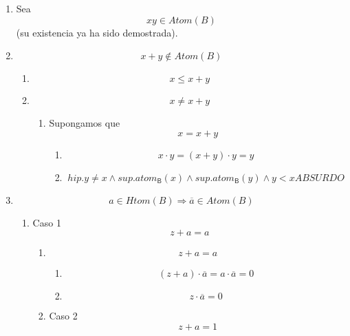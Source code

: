 \documentclass[
]{article}
\providecommand{\tightlist}{%
  \setlength{\itemsep}{0pt}\setlength{\parskip}{0pt}}
\begin{document}
\begin{enumerate}
\begin{enumerate}
\begin{enumerate}
      \begin{enumerate}
      \def\labelenumiv{\arabic{enumiv}.}
      \item
        Sea \[{\mathit{xy} \in \mathit{Atom}}{(B)}\] (su existencia ya
        ha sido demostrada).
      \item
        \[{{x + y} \notin \mathit{Atom}}{(B)}\]

        \begin{enumerate}
        \def\labelenumv{\arabic{enumv}.}
        \item
          \[x \leq {x + y}\]
        \item
          \[x \neq {x + y}\]

          \begin{enumerate}
          \def\labelenumvi{\arabic{enumvi}.}
          \item
            Supongamos que\[x = {x + y}\]

            \begin{enumerate}
            \def\labelenumvii{\arabic{enumvii}.}
            \tightlist
            \item
              \[{{x \cdot y} = {{({x + y})} \cdot y}} = y\]
            \item
              \[\mathit{hip.}{y \neq {x \land \mathit{sup.}}}\mathsf{\mathit{atom}_{B}}{{(x)} \land \mathit{sup.}}\mathsf{\mathit{atom}_{B}}{{{(y)} \land y} < x}\mathit{ABSURDO}\]
            \end{enumerate}
          \end{enumerate}
        \end{enumerate}
      \item
        \[{a \in \mathit{Htom}}{(B)}\Rightarrow{\overline{a} \in \mathit{Atom}}{(B)}\]

        \begin{enumerate}
        \def\labelenumv{\arabic{enumv}.}
        \item
          Caso 1 \[{z + a} = a\]

          \begin{enumerate}
          \def\labelenumvi{\arabic{enumvi}.}
          \item
            \[{z + a} = a\]

            \begin{enumerate}
            \def\labelenumvii{\arabic{enumvii}.}
            \tightlist
            \item
              \[{{{({z + a})} \cdot \overline{a}} = {a \cdot \overline{a}}} = 0\]
            \item
              \[{z \cdot \overline{a}} = 0\]
            \end{enumerate}
          \item
            Caso 2 \[{z + a} = 1\]


\end{enumerate}
\end{enumerate}
\end{enumerate}
\end{enumerate}
\end{enumerate}
\end{enumerate}
\end{document}
